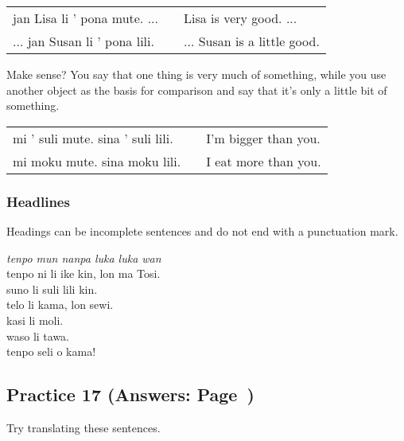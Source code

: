 \begin{supertabular}{p{5,5cm}|ll}
jan Lisa li ' pona mute. ...  && Lisa is very good. ... \\ %
... jan Susan li ' pona lili. && ... Susan is a little good. \\ %
\end{supertabular} 

Make sense? 
You say that one thing is very much of something, while you use another object as the basis for comparison and say that it's only a little bit of something. 

\begin{supertabular}{p{5,5cm}|ll}
mi ' suli mute. sina ' suli lili. && I'm bigger than you. \\
mi moku mute. sina moku lili. && I eat more than you. \\
\end{supertabular} 
%
\subsubsection*{Headlines} 
%
Headings can be incomplete sentences and do not end with a punctuation mark.

\textit{tenpo mun nanpa luka luka wan} \\
tenpo ni li ike kin, lon ma Tosi. \\
suno li suli lili kin. \\ 
telo li kama, lon sewi. \\
kasi li moli. \\
waso li tawa. \\
tenpo seli o kama! 

\newpage
\subsection*{Practice 17 (Answers: Page~\pageref{'la'})}
%
Try translating these sentences.

